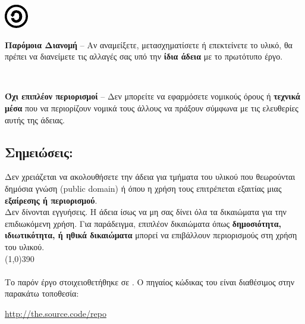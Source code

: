 \vspace{1em}
\noindent
\parbox{1.5cm}{\includegraphics[scale=1.5]{license/images/cc_sa_30}}
\parbox{10.5cm}{\textbf{Παρόμοια Διανομή}  -- Αν αναμείξετε, μετασχηματίσετε ή επεκτείνετε το υλικό, θα πρέπει να διανείμετε τις αλλαγές σας υπό την \textbf{ίδια άδεια} με το πρωτότυπο έργο.}

\vspace{1em}
\noindent
\parbox{1.5cm}{\ }
\parbox{10.5cm}{\textbf{Όχι επιπλέον περιορισμοί} -- Δεν μπορείτε να εφαρμόσετε νομικούς όρους ή \textbf{τεχνικά μέσα} που να περιορίζουν νομικά τους άλλους να πράξουν σύμφωνα με τις ελευθερίες αυτής της άδειας.}
\subsection*{Σημειώσεις:}
\noindent
Δεν χρειάζεται να ακολουθήσετε την άδεια για τμήματα του υλικού που θεωρούνται δημόσια γνώση (public domain) ή όπου η χρήση τους επιτρέπεται εξαιτίας μιας \textbf{εξαίρεσης ή περιορισμού}.\\

\noindent
Δεν δίνονται εγγυήσεις. Η άδεια ίσως να μη σας δίνει όλα τα δικαιώματα για την επιδιωκόμενη χρήση. Για παράδειγμα, επιπλέον δικαιώματα όπως \textbf{δημοσιότητα, ιδιωτικότητα, ή ηθικά δικαιώματα} μπορεί να επιβάλλουν περιορισμούς στη χρήση του υλικού.\\
\line(1,0){390}\\\\
\noindent
Το παρόν έργο στοιχειοθετήθηκε σε \XeLaTeX. Ο πηγαίος κώδικας του είναι διαθέσιμος στην παρακάτω τοποθεσία:
\begin{center}
\url{http://the.source.code/repo}
\end{center}
\newpage
